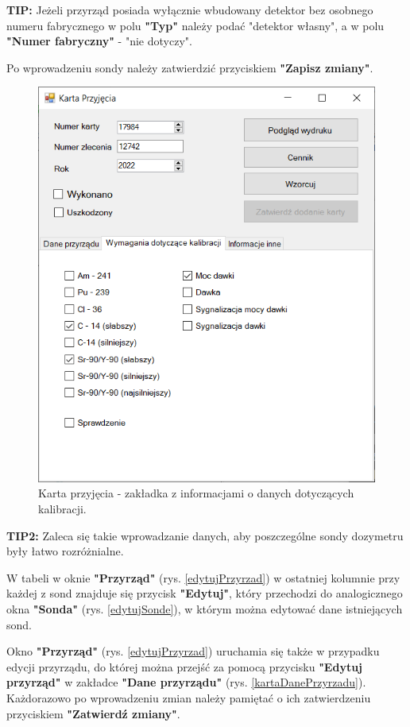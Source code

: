 \textbf{TIP:} Jeżeli przyrząd posiada wyłącznie wbudowany detektor bez osobnego numeru fabrycznego w polu \textbf{"Typ"} należy podać "detektor własny", a w polu \textbf{"Numer fabryczny"} - "nie dotyczy". 

Po wprowadzeniu sondy należy zatwierdzić przyciskiem \textbf{"Zapisz zmiany"}. 

\begin{figure}[H]
	\centering
	\includegraphics{obrazki/Biuro/karta/karta_dane_wymagania.png}
	\caption{Karta przyjęcia - zakładka z informacjami o danych dotyczących kalibracji.}
	\label{kartaDaneKalibracji}
\end{figure}

\textbf{TIP2:} Zaleca się takie wprowadzanie danych, aby poszczególne sondy dozymetru były łatwo rozróżnialne.

W tabeli w oknie \textbf{"Przyrząd"} (rys. \ref{edytujPrzyrzad}) w ostatniej kolumnie przy każdej z sond znajduje się przycisk \textbf{"Edytuj"}, który przechodzi do analogicznego okna \textbf{"Sonda"} (rys. \ref{edytujSonde}), w którym można edytować dane istniejących sond. 

Okno \textbf{"Przyrząd"} (rys. \ref{edytujPrzyrzad}) uruchamia się także w przypadku edycji przyrządu, do której można przejść za pomocą przycisku \textbf{"Edytuj przyrząd"} w zakładce \textbf{"Dane przyrządu"} (rys. \ref{kartaDanePrzyrzadu}). Każdorazowo po wprowadzeniu zmian należy pamiętać o ich zatwierdzeniu przyciskiem \textbf{"Zatwierdź zmiany"}.
 
